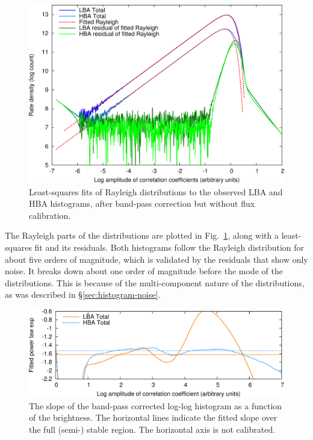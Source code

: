 \documentclass[useAMS,usenatbib]{mn2e}
\begin{document}
\begin{figure}
\begin{center}
\includegraphics[width=13cm]{img/histograms-with-fits-trimmed}
\caption{Least-squares fits of Rayleigh distributions to the observed LBA and HBA histograms, after band-pass correction but without flux calibration.}
\label{fig:histograms-with-fits}
\end{center}
\end{figure}

The Rayleigh parts of the distributions are plotted in Fig.~\ref{fig:histograms-with-fits}, along with a least-squares fit and its residuals. Both histograms follow the Rayleigh distribution for about five orders of magnitude, which is validated by the residuals that show only noise. It breaks down about one order of magnitude before the mode of the distributions. This is because of the multi-component nature of the distributions, as was described in \S\ref{sec:histogram-noise}.

\begin{figure}
\begin{center}
\includegraphics[width=13cm]{img/slopes-trimmed}
\caption{The slope of the band-pass corrected log-log histogram as a function of the brightness. The horizontal lines indicate the fitted slope over the full (semi-) stable region. The horizontal axis is not calibrated.}
\label{fig:plot-slopes}
\end{center}
\end{figure}
\end{document}

